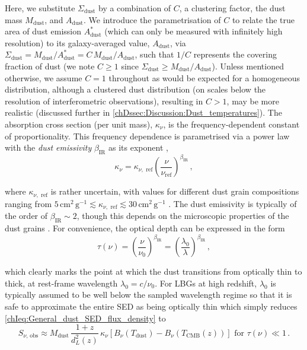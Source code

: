 Here, we substitute $\Sigma_\text{dust}$ by a combination of $C$, a clustering factor, the dust mass $M_\text{dust}$, and $A_\text{dust}$. We introduce the parametrisation of $C$ to relate the true area of dust emission $A_\text{dust}^*$ (which can only be measured with infinitely high resolution) to its galaxy-averaged value, $A_\text{dust}$, via $\Sigma_\text{dust} = M_\text{dust} / A_\text{dust}^* = C \, M_\text{dust} / A_\text{dust}$, such that $1/C$ represents the covering fraction of dust (we note $C \geq 1$ since $\Sigma_\text{dust} \geq M_\text{dust} / A_\text{dust}$). Unless mentioned otherwise, we assume $C = 1$ throughout as would be expected for a homogeneous distribution, although a clustered dust distribution (on scales below the resolution of interferometric observations), resulting in $C > 1$, may be more realistic (discussed further in \cref{chDssec:Discussion:Dust_temperatures}). The absorption cross section (per unit mass), $\kappa_\nu$, is the frequency-dependent constant of proportionality. This frequency dependence is parametrised via a power law with the \textit{dust emissivity} $\beta_\text{IR}$ as its exponent \citep{2006ApJ...636.1114D},
\begin{equation}
    \label{chIeq:Dust_mass_absorption_coefficient_form}
    \kappa_\nu = \kappa_{\nu, \text{ ref}} \left( \frac{\nu}{\nu_\text{ref}} \right)^{\beta_\text{IR}} \, ,
\end{equation}

\noindent where $\kappa_{\nu, \text{ ref}}$ is rather uncertain, with values for different dust grain compositions ranging from $5 \, \mathrm{cm^2 \, g^{-1}} \lesssim \kappa_{\nu, \text{ ref}} \lesssim 30 \, \mathrm{cm^2 \, g^{-1}}$ \citep[see][, and references therein]{2014MNRAS.443.1704H}. The dust emissivity is typically of the order of $\beta_\text{IR} \sim 2$, though this depends on the microscopic properties of the dust grains \citep{2013A&A...560A..91J}. For convenience, the optical depth can be expressed in the form
\begin{equation}
    \label{chIeq:Optical_depth}
    \tau (\nu) = \left( \frac{\nu}{\nu_0} \right)^{\beta_\text{IR}} = \left( \frac{\lambda_0}{\lambda} \right)^{\beta_\text{IR}} \, ,
\end{equation}

\noindent which clearly marks the point at which the dust transitions from optically thin to thick, at rest-frame wavelength $\lambda_0 = c/\nu_0$. For LBGs at high redshift, $\lambda_0$ is typically assumed to be well below the sampled wavelength regime so that it is safe to approximate the entire SED as being optically thin \citep[e.g.][]{2021MNRAS.508L..58B} which simply reduces \cref{chIeq:General_dust_SED_flux_density} to
\begin{equation}
    \label{chIeq:OT_dust_SED_flux_density}
    S_{\nu, \, \text{obs}} \approx M_\text{dust} \, \frac{1+z}{d_L^2 (z)} \, \kappa_\nu \left[ B_\nu \left(T_\text{dust} \right) - B_\nu \left(T_\text{CMB} (z) \right) \right] \text{ for } \tau (\nu) \ll 1 \, .
\end{equation}


